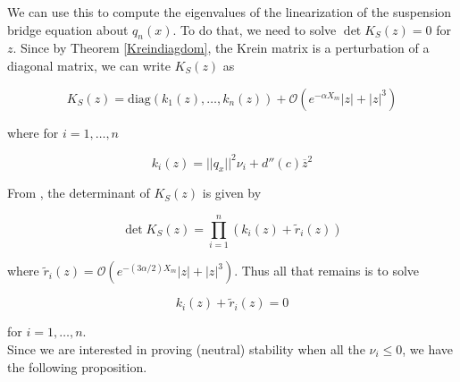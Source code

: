 \documentclass[12pt]{article}
\begin{document}
We can use this to compute the eigenvalues of the linearization of the suspension bridge equation about $q_n(x)$. To do that, we need to solve $\det K_S(z) = 0$ for $z$. Since by Theorem \ref{Kreindiagdom}, the Krein matrix is a perturbation of a diagonal matrix, we can write $K_S(z)$ as 

\begin{equation}
K_S(z) = \text{diag}(k_1(z), \dots, k_n(z)) + \mathcal{O}(e^{-\alpha X_m}|z| + |z|^3)
\end{equation}

where for $i = 1, \dots, n$

\begin{equation}
k_i(z) = ||q_x||^2 \nu_i + d''(c) \overline{z}^2
\end{equation}

From \cite{Ipsen2008}, the determinant of $K_S(z)$ is given by

\begin{equation}\label{detK}
\det K_S(z) = \prod_{i = 1}^n (k_i(z) + \tilde{r}_i(z))
\end{equation}

where $\tilde{r}_i(z) = \mathcal{O}(e^{-(3 \alpha/2) X_m}|z| + |z|^3)$. Thus all that remains is to solve

\[
k_i(z) + \tilde{r}_i(z) = 0
\]

for $i = 1, \dots, n$.\\

Since we are interested in proving (neutral) stability when all the $\nu_i \leq 0$, we have the following proposition.
\end{document}

